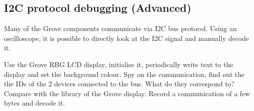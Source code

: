 \subsection{I2C protocol debugging (Advanced)}
Many of the Grove components communicate via \ac{I2C} bus protocol. Using an oscilloscope, it is possible to directly look at the \ac{I2C} signal and manually decode it.
%
\begin{atask}[\ac{I2C} decoding]
  Use the Grove RBG LCD display, initialise it, periodically write text to the display and set the background colour. Spy on the communication, find out the the IDs of the 2 devices connected to the bus. What do they correspond to? Compare with the library of the Grove display. Record a communication of a few bytes and decode it.
\end{atask}

